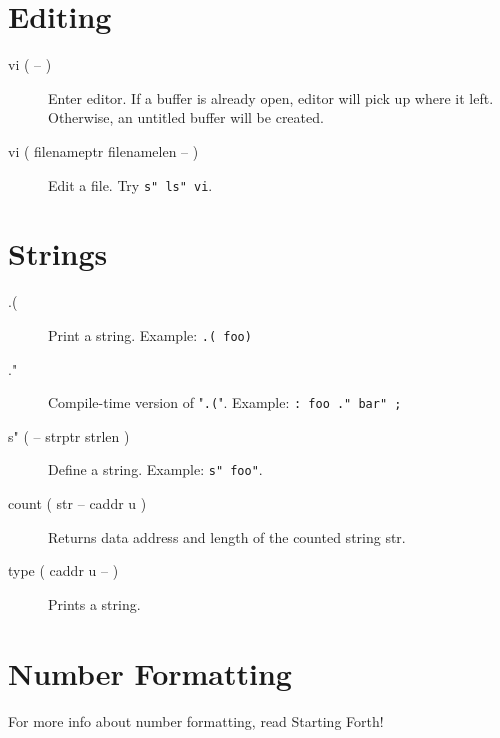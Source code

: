 \section{Editing}

\begin{description}
\item[vi ( -- )]

Enter editor. If a buffer is already open, editor will pick up where it left.
Otherwise, an untitled buffer will be created.

\end{description}

\begin{description}
\item[vi ( filenameptr filenamelen -- )]

Edit a file. Try \texttt{s" ls" vi}.

\end{description}

\section{Strings}

\begin{description}
\item[.(]

Print a string. Example: \texttt{.( foo)}

\item[."]

Compile-time version of "\texttt{.(}". Example: \texttt{: foo ." bar" ;}

\item[s" ( -- strptr strlen )] Define a string. Example: \texttt{s" foo"}. 

\item[count ( str -- caddr u )] Returns data address and length of the counted string str.

\item[type ( caddr u -- )] Prints a string.

\end{description}

\section{Number Formatting}

For more info about number formatting, read Starting Forth!

